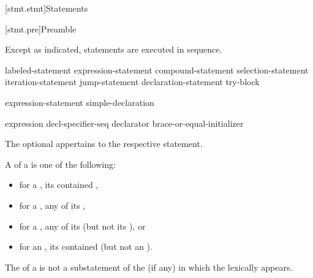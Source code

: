 [stmt.stmt]{Statements}%



[stmt.pre]{Preamble}

\pnum
Except as indicated, statements are executed in sequence.

\begin{bnf}
\br
    labeled-statement\br
     expression-statement\br
     compound-statement\br
     selection-statement\br
     iteration-statement\br
     jump-statement\br
    declaration-statement\br
     try-block

\br
    expression-statement\br
    simple-declaration

\br
    expression\br
     decl-specifier-seq declarator brace-or-equal-initializer
\end{bnf}

The optional  appertains to the respective statement.

\pnum
A  of a  is one of the following:
\begin{itemize}
\item
  for a , its contained ,
\item
  for a , any  of its ,
\item
  for a , any of its  (but not its ), or
\item
  for an , its contained  (but not an ).
\end{itemize}
\begin{note}
The  of a 
is not a substatement of the  (if any)
in which the  lexically appears.
\end{note}

